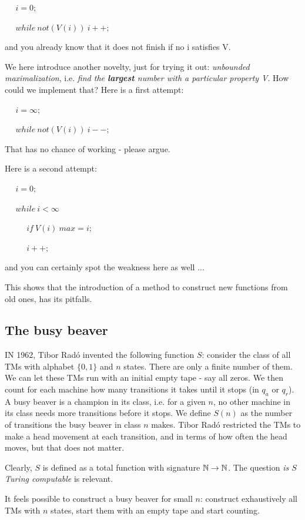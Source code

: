 $~~~~~~i = 0;$

$~~~~~~while~not(V(i))~i++;$


and you already know that it does not finish if no i satisfies V.

We here introduce another novelty, just for trying it out: {\em
  unbounded maximalization}, i.e. {\em find the {\bf largest} number
  with a particular property V}. How could we implement that? Here is
a first attempt:


$~~~~~~i = \infty;$

$~~~~~~while~not(V(i))~i--;$


That has no chance of working - please argue.


Here is a second attempt:


$~~~~~~i = 0;$

$~~~~~~while~i < \infty$

$~~~~~~~~~~~~if~V(i)~max = i;$

$~~~~~~~~~~~~i++;$


and you can certainly spot the weakness here as well ...

This shows that the introduction of a method to construct new
functions from old ones, has its pitfalls.


\subsection{The busy beaver}

IN 1962, Tibor Rad\'{o} invented the following function $S$:
consider the class of all TMs with alphabet $\{0,1\}$ and $n$
states. There are only a finite number of them. We can let these
TMs run with an initial empty tape - say all zeros. We then count for
each machine how many transitions it takes until it stops (in $q_a$ or
$q_r$).  A busy beaver is a champion in its class, i.e. for a given
$n$, no other machine in its class needs more transitions before it
stops. We define $S(n)$ as the number of transitions the busy beaver
in class $n$ makes. Tibor Rad\'{o} restricted the TMs to make a head
movement at each transition, and in terms of how often the head moves,
but that does not matter.

Clearly, $S$ is defined as a total function with signature $\mathbb{N}
\rightarrow \mathbb{N}$. The question {\em is $S$ Turing computable} is
relevant.


It feels possible to construct a busy beaver for small $n$: construct
exhaustively all TMs with $n$ states, start them with an empty tape
and start counting.

